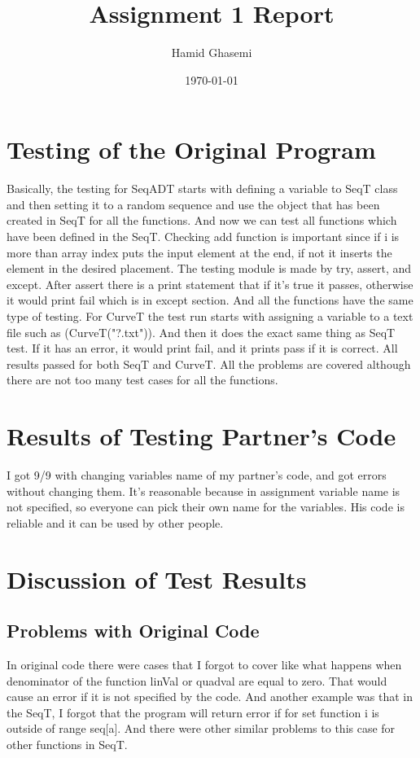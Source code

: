 \documentclass[12pt]{article}
\title{Assignment 1 Report}
\author{Hamid Ghasemi}
\date{\today}
\begin{document}
\maketitle


\section{Testing of the Original Program}
Basically, the testing for SeqADT starts with defining a variable to SeqT class and then setting it to a random sequence and use the object that has been created in SeqT for all the functions. And now we can test all functions which have been defined in the SeqT. Checking add function is important since if i is more than array index puts the input element at the end, if not it inserts the element in the desired placement. The testing module is made by try, assert, and except. After assert there is a print statement that if it's true it passes, otherwise it would print fail which is in except section. And all the functions have the same type of testing. For CurveT the test run starts with assigning a variable to a text file such as (CurveT("?.txt")). And then it does the exact same thing as SeqT test. If it has an error, it would print fail, and it prints pass if it is correct. All results passed for both SeqT and CurveT. All the problems are covered although there are not too many test cases for all the functions.


\section{Results of Testing Partner's Code}

I got 9/9 with changing variables name of my partner’s code, and got errors without changing them. It's reasonable because in assignment variable name is not specified, so everyone can pick their own name for the variables. His code is reliable and it can be used by other people.

\section{Discussion of Test Results}

\subsection{Problems with Original Code}
In original code there were cases that I forgot to cover like what happens when denominator
of the function linVal or quadval are equal to zero. That would cause an error if it is not specified by the code. And another example was that in the SeqT, I forgot that the program will return error if for set function i is outside of range seq[a]. And there were other similar problems to this case for other functions in SeqT.
\end{document}
